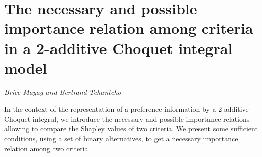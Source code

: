 \documentclass[../booklet.tex]{subfiles}
\begin{document}
\section[The necessary and possible importance relation among criteria in a 2-additive Choquet integral model. {\it Brice Mayag and Bertrand Tchantcho}]{The necessary and possible importance relation among criteria in a 2-additive Choquet integral model}
 

\begin{center}
  {\it Brice Mayag and Bertrand Tchantcho}
\end{center}

\vskip 0.8cm


In the context of the representation of a preference information by a 2-additive Choquet integral, we introduce  the necessary and possible importance relations allowing to compare the Shapley values of two criteria. We present some sufficient conditions, using a set of binary alternatives, to get a necessary importance relation among two criteria. 

\end{document}

